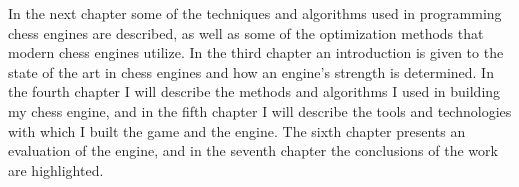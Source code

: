 In the next chapter some of the techniques and algorithms used in programming chess engines are described, as well as some of the optimization methods that modern chess engines utilize. In the third chapter an introduction is given to the state of the art in chess engines and how an engine's strength is determined. In the fourth chapter I will describe the methods and algorithms I used in building my chess engine, and in the fifth chapter I will describe the tools and technologies with which I built the game and the engine. The sixth chapter presents an evaluation of the engine, and in the seventh chapter the conclusions of the work are highlighted.
